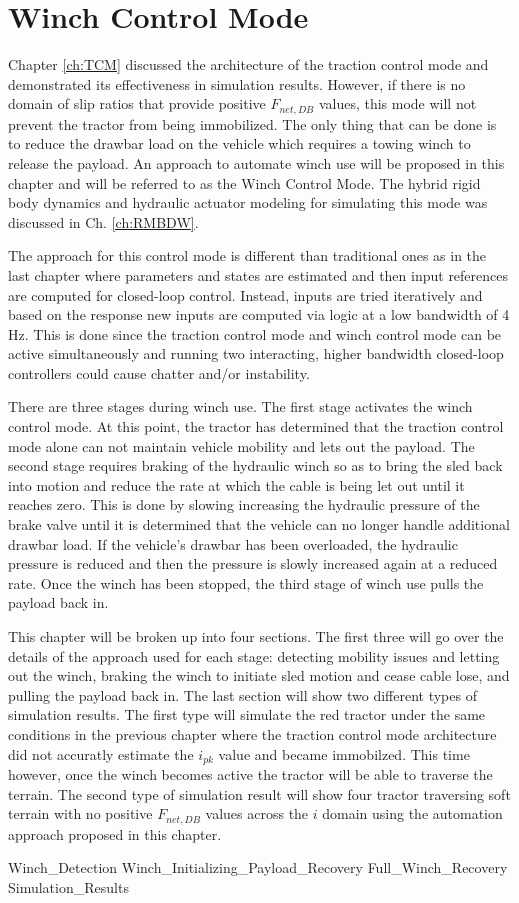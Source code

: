 \chapter{Winch Control Mode}

Chapter \ref{ch:TCM} discussed the architecture of the traction control mode and demonstrated its effectiveness in simulation results. However, if there is no domain of slip ratios that provide positive $F_{net,DB}$ values, this mode will not prevent the tractor from being immobilized. The only thing that can be done is to reduce the drawbar load on the vehicle which requires a towing winch to release the payload. An approach to automate winch use will be proposed in this chapter and will be referred to as the Winch Control Mode. The hybrid rigid body dynamics and hydraulic actuator modeling for simulating this mode was discussed in Ch. \ref{ch:RMBDW}.

The approach for this control mode is different than traditional ones as in the last chapter where parameters and states are estimated and then input references are computed for closed-loop control. Instead, inputs are tried iteratively and based on the response new inputs are computed via logic at a low bandwidth of 4 Hz. This is done since the traction control mode and winch control mode can be active simultaneously and running two interacting, higher bandwidth closed-loop controllers could cause chatter and/or instability.

There are three stages during winch use. The first stage activates the winch control mode. At this point, the tractor has determined that the traction control mode alone can not maintain vehicle mobility and lets out the payload. The second stage requires braking of the hydraulic winch so as to bring the sled back into motion and reduce the rate at which the cable is being let out until it reaches zero. This is done by slowing increasing the hydraulic pressure of the brake valve until it is determined that the vehicle can no longer handle additional drawbar load. If the vehicle's drawbar has been overloaded, the hydraulic pressure is reduced and then the pressure is slowly increased again at a reduced rate. Once the winch has been stopped, the third stage of winch use pulls the payload back in. 

This chapter will be broken up into four sections. The first three will go over the details of the approach used for each stage: detecting mobility issues and letting out the winch, braking the winch to initiate sled motion and cease cable lose, and pulling the payload back in. The last section will show two different types of simulation results. The first type will simulate the red tractor under the same conditions in the previous chapter where the traction control mode architecture did not accuratly estimate the $i_{pk}$ value and became immobilzed. This time however, once the winch becomes active the tractor will be able to traverse the terrain. The second type of simulation result will show four tractor traversing soft terrain with no positive $F_{net,DB}$ values across the $i$ domain using the automation approach proposed in this chapter. 

{Winch_Detection}
{Winch_Initializing_Payload_Recovery}
{Full_Winch_Recovery}
{Simulation_Results}